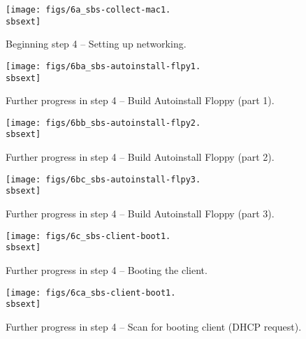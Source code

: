 \begin{figure}[h]
  \begin{center}

    \centerline{\texttt{[image: figs/6a\_sbs-collect-mac1.\\sbsext]}}
    \caption{Beginning step 4 -- Setting up networking.}
    \label{fig:sbs-setup-network1}
  \end{center}
\end{figure}



\begin{figure}[htbp]
  \begin{center}
    \centerline{\texttt{[image: figs/6ba\_sbs-autoinstall-flpy1.\\sbsext]}}
    \caption{Further progress in step 4 -- Build Autoinstall Floppy
      (part 1).} 
    \label{fig:sbs-autoinstall-flpy1}
  \end{center}
\end{figure}

\begin{figure}[htbp]
  \begin{center}
    \centerline{\texttt{[image: figs/6bb\_sbs-autoinstall-flpy2.\\sbsext]}}
    \caption{Further progress in step 4 -- Build Autoinstall Floppy
      (part 2).} 
    \label{fig:sbs-autoinstall-flpy2}
  \end{center}
\end{figure}

\begin{figure}[htbp]
  \begin{center}
    \centerline{\texttt{[image: figs/6bc\_sbs-autoinstall-flpy3.\\sbsext]}}
    \caption{Further progress in step 4 -- Build Autoinstall Floppy
      (part 3).} 
    \label{fig:sbs-autoinstall-flpy3}
  \end{center}
\end{figure}

\begin{figure}[htbp]
  \begin{center}
    \centerline{\texttt{[image: figs/6c\_sbs-client-boot1.\\sbsext]}}
    \caption{Further progress in step 4 -- Booting the client.}
    \label{fig:sbs-collect-boot1}
  \end{center}
\end{figure}

\begin{figure}[htbp]
  \begin{center}
    \centerline{\texttt{[image: figs/6ca\_sbs-client-boot1.\\sbsext]}}
    \caption{Further progress in step 4 -- Scan for booting client (DHCP
      request).}
    \label{fig:sbs-client-boot2}
  \end{center}
\end{figure}

